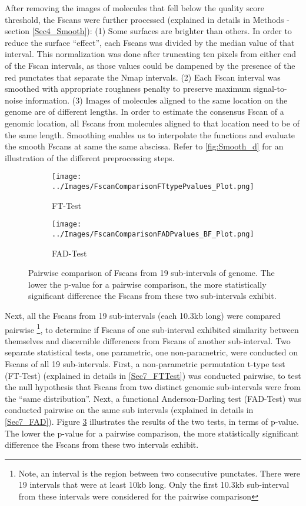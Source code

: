 After removing the images of molecules that fell below the quality score threshold, the Fscans were further processed (explained in details in Methods - section \ref{Sec4_Smooth}): (1) Some surfaces are brighter than others. In order to reduce the surface ``effect'', each Fscans was divided by the median value of that interval. This normalization was done after truncating ten pixels from either end of the Fscan intervals, as those values could be dampened by the presence of the red punctates that separate the Nmap intervals. (2) Each Fscan interval was smoothed with appropriate roughness penalty to preserve maximum signal-to-noise information. (3) Images of molecules aligned to the same location on the \mf genome are of different lengths. In order to estimate the consensus Fscan of a genomic location, all Fscans from molecules aligned to that location need to be of the same length. Smoothing enables us to interpolate the functions and evaluate the smooth Fscans at same the same abscissa. Refer to \ref{fig:Smooth_d} for an illustration of the different preprocessing steps.

\begin{figure}[H]
\centering
\begin{subfigure}{0.49\linewidth}
\texttt{[image: ../Images/FscanComparisonFTtypePvalues\_Plot.png]}
\caption{FT-Test}
\label{fig:FTTest}
\end{subfigure}
\begin{subfigure}{0.49\linewidth}
\texttt{[image: ../Images/FscanComparisonFADPvalues\_BF\_Plot.png]}
\caption{FAD-Test}
\label{fig:FADTest}
\end{subfigure}
\caption{Pairwise comparison of Fscans from 19 sub-intervals of \mf genome. The lower the p-value for a pairwise comparison, the more statistically significant difference the Fscans from these two sub-intervals exhibit.}
\label{fig:PairwiseTest_MF}
\end{figure}

Next, all the Fscans from 19 sub-intervals (each 10.3kb long) were compared pairwise \footnote{Note, an interval is the region between two consecutive punctates. There were 19 intervals that were at least 10kb long. Only the first 10.3kb sub-interval from these intervals were considered for the pairwise comparison}, to determine if Fscans of one sub-interval exhibited similarity between themselves and discernible differences from Fscans of another sub-interval. Two separate statistical tests, one parametric, one non-parametric, were conducted on Fscans of all 19 sub-intervals. First, a non-parametric permutation t-type test (FT-Test) (explained in details in \ref{Sec7_FTTest}) was conducted pairwise, to test the null hypothesis that Fscans from two distinct genomic sub-intervals were from the ``same distribution''. Next, a functional Anderson-Darling test (FAD-Test) was conducted pairwise on the same sub intervals (explained in details in \ref{Sec7_FAD}). Figure \ref{fig:PairwiseTest_MF} illustrates the results of the two tests, in terms of p-value. The lower the p-value for a pairwise comparison, the more statistically significant difference the Fscans from these two intervals exhibit. 

